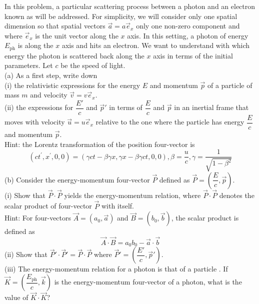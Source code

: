 \begin{example}
    In this problem, a particular scattering process between a photon and an electron known as  will be addressed. For simplicity, we will consider only one spatial dimension so that spatial vectors $\vec{a}=a\vec{e}_x$   only one non-zero component and where $\vec{e}_x$ is the unit vector along the $x$ axis. In this setting, a photon of energy $E_\mathrm{ph}$ is  along the $x$ axis and hits an electron. We want to understand with which energy the photon is scattered back along the $x$ axis in terms of the initial parameters. Let $c$ be the speed of light.
    \\(a) As a first step, write down
    \\\hspace*{2em}(i) the relativistic expressions for the energy $E$ and momentum $\vec{p}$ of a particle of mass $m$ and velocity $\vec{v} = v\vec{e}_x$.
    \\\hspace*{2em}(ii) the expressions for $\dfrac{E'}{c}$ and $\vec{p}'$ in terms of $\dfrac{E}{c}$ and $\vec{p}$ in an inertial frame that moves with
    velocity $\vec{u}=u\vec{e}_{x}$ relative to the one where the particle has energy $\dfrac{E}{c}$ and momentum $\vec{p}$.\\
    Hint: the Lorentz transformation of the position four-vector is \[(ct^{\prime},x^{\prime},0,0)=(\gamma ct-\beta\gamma x,\gamma x-\beta \gamma ct, 0, 0), \beta = \dfrac{u}{c}, \gamma = \dfrac{1}{\sqrt {1- \beta ^2}}\]
    (b) Consider the energy-momentum four-vector $\vec{P}$ defined as $\vec{P}=(\dfrac{E}{c},\vec{p})$.\\
    \hspace*{2em}(i) Show that $\vec{P}\cdot\vec{P}$ yields the energy-momentum relation, where $\vec{P}\cdot\vec{P}$ denotes the scalar product of four-vector $\vec{P}$ with itself.\\ Hint: For four-vectors $\vec{A}=(a_0,\vec{a})$ and $\vec{B}=(b_0,\vec{b})$, the scalar product is defined as  \[\vec{A}\cdot\vec{B}=a_{0}b_{0}-\vec{a}\cdot\vec{b}\]
    \hspace*{2em}(ii) Show that $\vec{P}'\cdot\vec{P}'=\vec{P}\cdot\vec{P}$ where $\vec{P}'=(\dfrac{E'}{c},\vec{p}')$.\\
    \hspace*{2em}(iii) The energy-momentum relation for a photon is that of a particle . If $\vec{K} = ( \dfrac{E_{\mathrm{ph}}}{c}, \vec{k} )$ is the energy-momentum four-vector of a photon, what is the value of $\vec{K}\cdot\vec{K}$?\\

\end{example}
